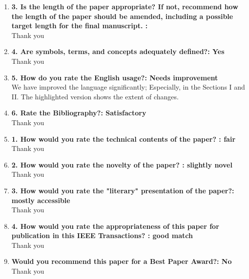 \documentclass[11pt]{article}
\begin{document}
\begin{enumerate}
\item\textbf{3. Is the length of the paper appropriate? If not, recommend how the length of the paper should be amended, including a possible target length for the final manuscript. :}\\
Thank you


\item\textbf{4. Are symbols, terms, and concepts adequately defined?: Yes
}\\
Thank you

\item\textbf{5. How do you rate the English usage?: Needs improvement}\\
We have improved the language significantly; Especially, in the Sections I and II. The highlighted version shows the extent of changes.

\item\textbf{6. Rate the Bibliography?: Satisfactory
}\\
Thank you
\item\textbf{1. How would you rate the technical contents of the paper? : fair}\\
Thank you
\item\textbf{2. How would you rate the novelty of the paper? : slightly novel}\\
Thank you

\item\textbf{3. How would you rate the "literary" presentation of the paper?: mostly accessible
}\\
Thank you
\item\textbf{4. How would you rate the appropriateness of this paper for publication in this IEEE Transactions? : good match}\\
Thank you

\item\textbf{Would you recommend this paper for a Best Paper Award?: No
}\\
Thank you

\end{enumerate}
\end{document}
